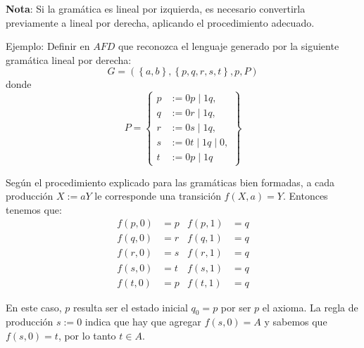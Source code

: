 \documentclass[12pt]{article}
\begin{document}
\vspace{0.2cm}

\textbf{Nota}: Si la gramática es lineal por izquierda, es necesario convertirla previamente a lineal por derecha, aplicando el procedimiento adecuado.

Ejemplo: Definir en $ AFD $ que reconozca el lenguaje generado por la siguiente gramática lineal por derecha:
\[
G=\left(\left\{a,b\right\},\left\{p,q,r,s,t\right\},p,P\right)
\]
donde 
\[
P = 
\left\{
\begin{aligned}
	p &:= 0p \mid 1q,\\
	q &:= 0r \mid 1q,\\
	r &:= 0s \mid 1q,\\
	s &:= 0t \mid 1q \mid 0,\\
	t &:= 0p \mid 1q
\end{aligned}
\right\}
\]

Según el procedimiento explicado para las gramáticas bien formadas, a cada producción $ X:=aY $ le corresponde una transición $ f(X,a)=Y $. Entonces tenemos que:
\[
\begin{aligned}
	f(p,0) &= p & f(p,1) &= q\\
	f(q,0) &= r & f(q,1) &= q\\
	f(r,0) &= s & f(r,1) &= q\\
	f(s,0) &= t & f(s,1) &= q\\
	f(t,0) &= p & f(t,1) &= q
\end{aligned}
\]

En este caso, $ p $ resulta ser el estado inicial $ q_{0}=p $ por ser $ p $ el axioma. La regla de producción $ s:=0 $ indica que hay que agregar $ f(s,0)=A $ y sabemos que $ f(s,0)=t $, por lo tanto $ t \in A $.
\end{document}
